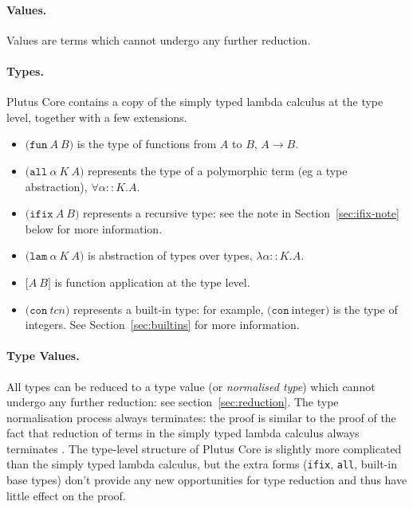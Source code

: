 \documentclass[a4paper]{article}
\newcommand{\keyword}[1]{\texttt{#1}}
\newcommand{\construct}[1]{\texttt{(} #1 \texttt{)}}
\newcommand{\funT}[2]{\construct{\keyword{fun} ~ #1 ~ #2}}
\newcommand{\ifixT}[2]{\construct{\keyword{ifix} ~ #1 ~ #2}}
\newcommand{\fixT}{\ifixT}
\newcommand{\allT}[3]{\construct{\keyword{all} ~ #1 ~ #2 ~ #3}}
\newcommand{\conT}[1]{\construct{\keyword{con} ~ #1}}
\newcommand{\lamT}[3]{\construct{\keyword{lam} ~ #1 ~ #2 ~ #3}}
\newcommand{\appT}[2]{\texttt{[} #1 ~ #2 \texttt{]}}
\begin{document}



\paragraph{Values.} Values are terms which cannot undergo any further reduction.

\paragraph{Types.} Plutus Core contains a copy of the simply typed lambda calculus
  at the type level, together with a few extensions.
\begin{itemize}
\item $\funT{A}{B}$ is the type of functions from $A$ to $B$, $A \rightarrow B$.
\item $\allT{\alpha}{K}{A}$ represents the type of a polymorphic term (eg a type abstraction), $\forall \alpha{::}K.A$.
\item $\fixT{A}{B}$ represents a recursive type: see the note in Section~\ref{sec:ifix-note} below for more information.
\item $\lamT{\alpha}{K}{A}$ is abstraction of types over types, $\lambda \alpha{::}K.A$.
\item $\appT{A}{B}$ is function application at the type level.
\item $\conT{tcn}$ represents a built-in type: for example, $\conT{\textrm{integer}}$
is the type of integers.  See Section~\ref{sec:builtins} for more information.
\end{itemize}

\paragraph{Type Values.} All types can be reduced to a type value (or
  \textit{normalised type}) which cannot undergo any further
  reduction: see section~\ref{sec:reduction}.  The type normalisation
  process always terminates: the proof is similar to the proof of the
  fact that reduction of terms in the simply typed lambda calculus
  always terminates \citep[\S12]{Pierce:TAPL}.  The type-level
  structure of Plutus Core is slightly more complicated than the
  simply typed lambda calculus, but the extra forms (\texttt{ifix},
  \texttt{all}, built-in base types) don't provide any new
  opportunities for type reduction and thus have little effect on the
  proof.
\end{document}
